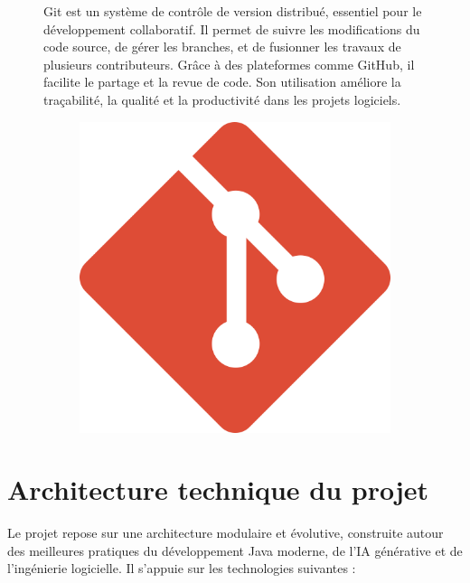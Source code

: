 \documentclass[12pt,a4paper]{report}
\begin{document}
	\begin{figure}[H]
		\begin{minipage}{0.8\textwidth}
			Git est un système de contrôle de version distribué, essentiel pour le développement collaboratif. Il permet de suivre les modifications du code source, de gérer les branches, et de fusionner les travaux de plusieurs contributeurs. Grâce à des plateformes comme GitHub, il facilite le partage et la revue de code. Son utilisation améliore la traçabilité, la qualité et la productivité dans les projets logiciels.
		\end{minipage}
		\hfill
		\begin{minipage}{0.15\textwidth} 
			\begin{figure}[H]
				\centering
				\includegraphics[width=\linewidth]{git-logo.png}
				\label{fig:git-logo}
			\end{figure}
		\end{minipage}
	\end{figure}
	
	\section{Architecture technique du projet}
	
	Le projet repose sur une architecture modulaire et évolutive, construite autour des meilleures pratiques du développement Java moderne, de l'IA générative et de l’ingénierie logicielle. Il s’appuie sur les technologies suivantes :
	
\end{document}

